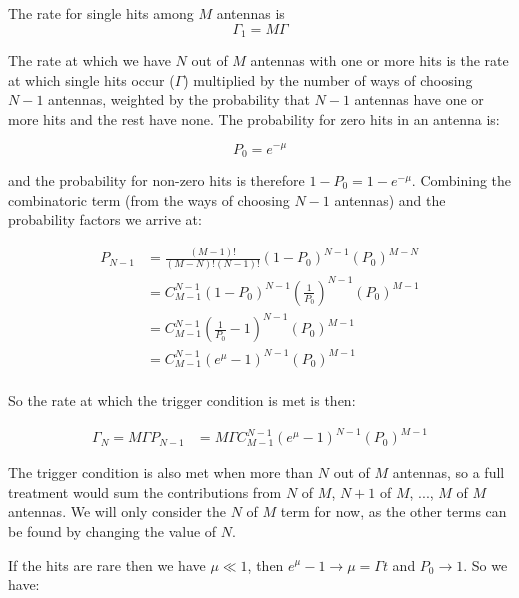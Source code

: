 The rate for single hits among $M$ antennas is
\begin{equation}
  \Gamma_{1} = M\Gamma
\end{equation}

The rate at which we have $N$ out of $M$ antennas with one or more hits is the rate at which single hits occur ($\Gamma$) multiplied by the number of ways of choosing $N-1$ antennas, weighted by the probability that $N-1$ antennas have one or more hits and the rest have none. The probability for zero hits in an antenna is:

\begin{equation}
  P_{0} = e^{-\mu}
\end{equation}

and the probability for non-zero hits is therefore $1-P_{0} = 1-e^{-\mu}$. Combining the combinatoric term (from the ways of choosing $N-1$ antennas) and the probability factors we arrive at:

\begin{equation}
  \begin{split}
  P_{N-1} &= \frac{(M-1)!}{(M-N)!(N-1)!}(1-P_{0})^{N-1}(P_{0})^{M-N}\\
  &= C^{N-1}_{M-1}  (1-P_{0})^{N-1}(\frac{1}{P_{0}})^{N-1}(P_{0})^{M-1}\\
  &= C^{N-1}_{M-1}  (\frac{1}{P_{0}}-1)^{N-1}(P_{0})^{M-1}\\
  &= C^{N-1}_{M-1}  (e^{\mu}-1)^{N-1}(P_{0})^{M-1}\\
  \end{split}
\end{equation}


So the rate at which the trigger condition is met is then:

\begin{equation}
  \begin{split}
    \Gamma_{N} = M \Gamma P_{N-1} &= M \Gamma C^{N-1}_{M-1} (e^{\mu}-1)^{N-1}(P_{0})^{M-1}
  \end{split}
\end{equation}

The trigger condition is also met when more than $N$ out of $M$ antennas, so a full treatment would sum the contributions from $N$ of $M$, $N+1$ of $M$, ..., $M$ of $M$ antennas. We will only consider the $N$ of $M$ term for now, as the other terms can be found by changing the value of $N$.

If the hits are rare then we have $\mu \ll 1$, then $e^{\mu}-1 \rightarrow \mu = \Gamma t$ and $P_{0} \rightarrow 1$. So we have:

